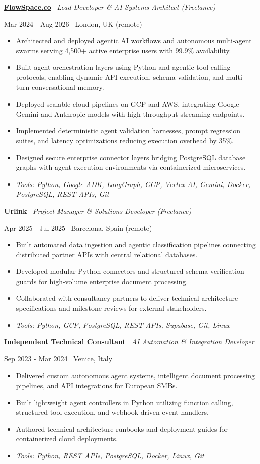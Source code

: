\documentclass[a4paper,10pt]{article}
\newcommand{\role}[4]{%
  \vspace{2pt}\noindent
  \begin{minipage}[t]{0.70\textwidth}\raggedright\textbf{#1} \textbullet\ \textit{#3}\end{minipage}%
  \hfill
  \begin{minipage}[t]{0.28\textwidth}\raggedleft\footnotesize\color{gray}#2 \textbullet\ #4\end{minipage}%
  \vspace{1pt}%
}
\begin{document}
\role{\href{https://flowspace.co}{FlowSpace.co}}{Mar 2024 - Aug 2026}{Lead Developer \& AI Systems Architect (Freelance)}{London, UK (remote)}
\begin{itemize}
  \item Architected and deployed agentic AI workflows and autonomous multi-agent swarms serving 4,500+ active enterprise users with 99.9\% availability.
  \item Built agent orchestration layers using Python and agentic tool-calling protocols, enabling dynamic API execution, schema validation, and multi-turn conversational memory.
  \item Deployed scalable cloud pipelines on GCP and AWS, integrating Google Gemini and Anthropic models with high-throughput streaming endpoints.
  \item Implemented deterministic agent validation harnesses, prompt regression suites, and latency optimizations reducing execution overhead by 35\%.
  \item Designed secure enterprise connector layers bridging PostgreSQL database graphs with agent execution environments via containerized microservices.
  \item \textit{Tools: Python, Google ADK, LangGraph, GCP, Vertex AI, Gemini, Docker, PostgreSQL, REST APIs, Git}
\end{itemize}

\role{Urlink}{Apr 2025 - Jul 2025}{Project Manager \& Solutions Developer (Freelance)}{Barcelona, Spain (remote)}
\begin{itemize}
  \item Built automated data ingestion and agentic classification pipelines connecting distributed partner APIs with central relational databases.
  \item Developed modular Python connectors and structured schema verification guards for high-volume enterprise document processing.
  \item Collaborated with consultancy partners to deliver technical architecture specifications and milestone reviews for external stakeholders.
  \item \textit{Tools: Python, GCP, PostgreSQL, REST APIs, Supabase, Git, Linux}
\end{itemize}

\role{Independent Technical Consultant}{Sep 2023 - Mar 2024}{AI Automation \& Integration Developer}{Venice, Italy}
\begin{itemize}
  \item Delivered custom autonomous agent systems, intelligent document processing pipelines, and API integrations for European SMBs.
  \item Built lightweight agent controllers in Python utilizing function calling, structured tool execution, and webhook-driven event handlers.
  \item Authored technical architecture runbooks and deployment guides for containerized cloud deployments.
  \item \textit{Tools: Python, REST APIs, PostgreSQL, Docker, Linux, Git}
\end{itemize}
\end{document}
